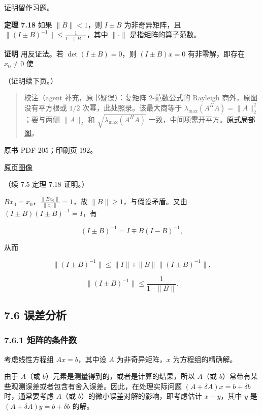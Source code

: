 \documentclass[
  10pt,
  fontset=fandol]{ctexart}
\begin{document}
证明留作习题。

\textbf{定理 7.18} 如果 \(\|B\|<1\)，则 \(I\pm B\) 为非奇异矩阵，且
\(\|(I\pm B)^{-1}\|\leqslant\frac1{1-\|B\|}\)，其中 \(\|\cdot\|\)
是指矩阵的算子范数。

\textbf{证明} 用反证法。若 \(\det(I\pm B)=0\)，则 \((I\pm B)x=0\)
有非零解，即存在 \(x_0\neq0\) 使

（证明续下页。）

\begin{quote}
校注（agent 补充，原书疑误）：复矩阵 2-范数公式的 Rayleigh
商外，原图没有平方根或 \(1/2\) 次幂，此处照录。该最大商等于
\(\lambda_{\max}(A^HA)=\|A\|_2^2\)；要与两侧 \(\|A\|_2\) 和
\(\sqrt{\lambda_{\max}(A^HA)}\)
一致，中间项需开平方。\href{../../../staging/ch07b/assets/204-complex-norm.png}{原式局部图}。
\end{quote}

\clearpage

原书 PDF 205；印刷页 192。

\href{../../../source-images/pdf-205.jpeg}{原页图像}

（续 7.5 定理 7.18 证明。）

\(Bx_0=x_0\)，\(\frac{\|Bx_0\|}{\|x_0\|}=1\)，故
\(\|B\|\geqslant1\)，与假设矛盾。又由 \((I\pm B)(I\pm B)^{-1}=I\)，有

\[
(I\pm B)^{-1}=I\mp B(I-B)^{-1},
\]

从而

\[
\|(I\pm B)^{-1}\|\leqslant\|I\|+\|B\|\|(I\pm B)^{-1}\|,
\]

\[
\|(I\pm B)^{-1}\|\leqslant\frac1{1-\|B\|}.
\]

\subsection{7.6 误差分析}\label{ux8befux5deeux5206ux6790}

\subsubsection{7.6.1
矩阵的条件数}\label{ux77e9ux9635ux7684ux6761ux4ef6ux6570}

考虑线性方程组 \(Ax=b\)，其中设 \(A\) 为非奇异矩阵，\(x\)
为方程组的精确解。

由于 \(A\)（或 \(b\)）元素是测量得到的，或者是计算的结果，所以 \(A\)（或
\(b\)）常带有某些观测误差或者包含有舍入误差。因此，在处理实际问题
\((A+\delta A)x=b+\delta b\) 时，通常要考虑 \(A\)（或
\(b\)）的微小误差对解的影响，即考虑估计 \(x-y\)，其中 \(y\) 是
\((A+\delta A)y=b+\delta b\) 的解。
\end{document}
